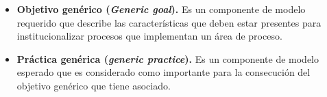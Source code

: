 \begin{itemize}
\item \textbf{\hypertarget{ggoal}{Objetivo genérico} (\textit{Generic goal}).} Es un componente de modelo requerido que describe las características que deben estar presentes para institucionalizar procesos que implementan un área de proceso. 
\item \textbf{\hypertarget{gpractice}{Práctica genérica} (\textit{generic practice}).} Es un componente de modelo esperado que es considerado como importante para la consecución del objetivo genérico que tiene asociado.

\end{itemize}
